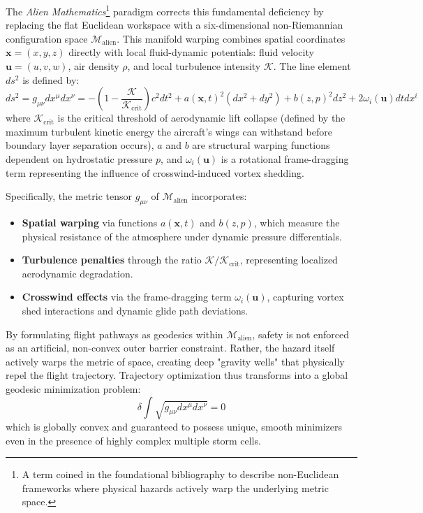 \documentclass[11pt,a4paper]{book}
\begin{document}
The \textit{Alien Mathematics}\footnote{A term coined in the foundational bibliography to describe non-Euclidean frameworks where physical hazards actively warp the underlying metric space.} paradigm corrects this fundamental deficiency by replacing the flat Euclidean workspace with a six-dimensional non-Riemannian configuration space $\mathcal{M}_{\text{alien}}$. This manifold warping combines spatial coordinates $\mathbf{x} = (x, y, z)$ directly with local fluid-dynamic potentials: fluid velocity $\mathbf{u} = (u, v, w)$, air density $\rho$, and local turbulence intensity $\mathcal{K}$. The line element $ds^2$ is defined by:
\begin{equation}
\label{eq:metric_tensor}
ds^2 = g_{\mu\nu} dx^\mu dx^\nu = -\left(1 - \frac{\mathcal{K}}{\mathcal{K}_{\text{crit}}}\right) c^2 dt^2 + a(\mathbf{x}, t)^2 (dx^2 + dy^2) + b(z, p)^2 dz^2 + 2 \omega_i(\mathbf{u}) dt dx^i
\end{equation}
where $\mathcal{K}_{\text{crit}}$ is the critical threshold of aerodynamic lift collapse (defined by the maximum turbulent kinetic energy the aircraft's wings can withstand before boundary layer separation occurs), $a$ and $b$ are structural warping functions dependent on hydrostatic pressure $p$, and $\omega_i(\mathbf{u})$ is a rotational frame-dragging term representing the influence of crosswind-induced vortex shedding.

Specifically, the metric tensor $g_{\mu\nu}$ of $\mathcal{M}_{\text{alien}}$ incorporates:
\begin{itemize}
    \item \textbf{Spatial warping} via functions $a(\mathbf{x}, t)$ and $b(z, p)$, which measure the physical resistance of the atmosphere under dynamic pressure differentials.
    \item \textbf{Turbulence penalties} through the ratio $\mathcal{K}/\mathcal{K}_{\text{crit}}$, representing localized aerodynamic degradation.
    \item \textbf{Crosswind effects} via the frame-dragging term $\omega_i(\mathbf{u})$, capturing vortex shed interactions and dynamic glide path deviations.
\end{itemize}

By formulating flight pathways as geodesics within $\mathcal{M}_{\text{alien}}$, safety is not enforced as an artificial, non-convex outer barrier constraint. Rather, the hazard itself actively warps the metric of space, creating deep "gravity wells" that physically repel the flight trajectory. Trajectory optimization thus transforms into a global geodesic minimization problem:
\begin{equation}
\label{eq:geodesic_minimization}
\delta \int \sqrt{g_{\mu\nu} dx^\mu dx^\nu} = 0
\end{equation}
which is globally convex and guaranteed to possess unique, smooth minimizers even in the presence of highly complex multiple storm cells.
\end{document}
